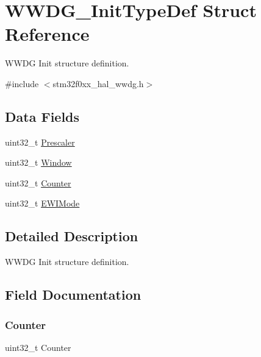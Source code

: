 \hypertarget{struct_w_w_d_g___init_type_def}{}\section{W\+W\+D\+G\+\_\+\+Init\+Type\+Def Struct Reference}
\label{struct_w_w_d_g___init_type_def}


W\+W\+DG Init structure definition.  




{\ttfamily \#include $<$stm32f0xx\+\_\+hal\+\_\+wwdg.\+h$>$}

\subsection*{Data Fields}
\begin{DoxyCompactItemize}
\item 
uint32\+\_\+t \hyperlink{struct_w_w_d_g___init_type_def_affb82025da5b8d4a06e61f1690460f4d}{Prescaler}
\item 
uint32\+\_\+t \hyperlink{struct_w_w_d_g___init_type_def_a0ea3a5767370dd42e6108643f23d5c68}{Window}
\item 
uint32\+\_\+t \hyperlink{struct_w_w_d_g___init_type_def_abef4248412159e665620f746a9d7d3f8}{Counter}
\item 
uint32\+\_\+t \hyperlink{struct_w_w_d_g___init_type_def_a1df23879272edb779395505a505eb0c3}{E\+W\+I\+Mode}
\end{DoxyCompactItemize}


\subsection{Detailed Description}
W\+W\+DG Init structure definition. 

\subsection{Field Documentation}
\mbox{\label{struct_w_w_d_g___init_type_def_abef4248412159e665620f746a9d7d3f8}} 
\subsubsection{\texorpdfstring{Counter}{Counter}}
{\footnotesize\ttfamily uint32\+\_\+t Counter}

